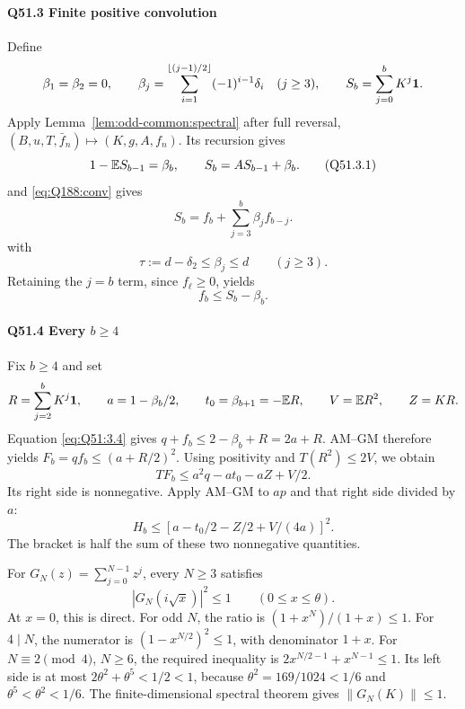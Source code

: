 \paragraph{Q51.3 Finite positive convolution}
Define
\[
\beta_1=\beta_2=0,\qquad
\beta_j=\sum_{i=1}^{\lfloor(j-1)/2\rfloor}(-1)^{i-1}\delta_i
\quad(j\ge3),\qquad
S_b=\sum_{j=0}^bK^j\mathbf1.
\]
Apply Lemma~\ref{lem:odd-common:spectral} after full reversal,
\((B,u,T,\bar f_n)\mapsto(K,g,A,f_n)\). Its recursion gives
\[
1-\mathbb E S_{b-1}=\beta_b,\qquad S_b=AS_{b-1}+\beta_b.
\tag{Q51.3.1}\label{eq:Q51:3.1}
\]
and \eqref{eq:Q188:conv} gives
\[
S_b=f_b+\sum_{j=3}^b\beta_jf_{b-j}.
\tag{Q51.3.2}\label{eq:Q51:3.2}
\]
with
\[
\tau:=d-\delta_2\le\beta_j\le d\qquad(j\ge3).
\tag{Q51.3.3}\label{eq:Q51:3.3}
\]
Retaining the \(j=b\) term, since \(f_\ell\ge0\), yields
\[
f_b\le S_b-\beta_b.
\tag{Q51.3.4}\label{eq:Q51:3.4}
\]

\paragraph{Q51.4 Every $b\ge\allowbreak 4$}
Fix \(b\ge\allowbreak 4\) and set
\[
R=\sum_{j=2}^bK^j\mathbf1,\qquad
a=1-\beta_b/2,\qquad t_0=\beta_{b+1}=-\mathbb E R,\qquad
V=\mathbb E R^2,\qquad Z=KR.
\]
Equation \eqref{eq:Q51:3.4} gives
\(q+f_b\le\allowbreak 2-\beta_b+R=\allowbreak 2a+R\).
AM--GM therefore yields \(F_b=\allowbreak qf_b\le\allowbreak (a+R/2)^2\).
Using positivity and \(T(R^2)\le\allowbreak 2V\), we obtain
\[
TF_b\le a^2q-at_0-aZ+V/2.
\tag{Q51.4.1}\label{eq:Q51:4.1}
\]
Its right side is nonnegative. Apply AM--GM to \(ap\) and that right side divided by \(a\):
\[
H_b\le[a-t_0/2-Z/2+V/(4a)]^2.
\tag{Q51.4.2}\label{eq:Q51:4.2}
\]
The bracket is half the sum of these two nonnegative quantities.

For \(G_N(z)=\allowbreak \sum_{j=\allowbreak 0}^{N-1}z^j\), every \(N\ge\allowbreak 3\) satisfies
\[
|G_N(i\sqrt x)|^2\le1\qquad(0\le x\le\theta).
\tag{Q51.4.3}\label{eq:Q51:4.3}
\]
At \(x=\allowbreak 0\), this is direct. For odd \(N\), the ratio is
\((1+x^N)/(1+x)\le\allowbreak 1\).
For \(4\mid N\), the numerator is \((1-x^{N/2})^2\le\allowbreak 1\), with denominator \(1+x\).
For \(N\equiv2\pmod4\), \(N\ge\allowbreak 6\), the required inequality is
\(2x^{N/2-1}+x^{N-1}\le\allowbreak 1\).
Its left side is at most \(2\theta^2+\theta^5<\allowbreak 1/2<\allowbreak 1\), because
\(\theta^2=\allowbreak 169/1024<\allowbreak 1/6\) and \(\theta^5<\allowbreak \theta^2<\allowbreak 1/6\).
The finite-dimensional spectral theorem gives \(\|G_N(K)\|\le\allowbreak 1\).

